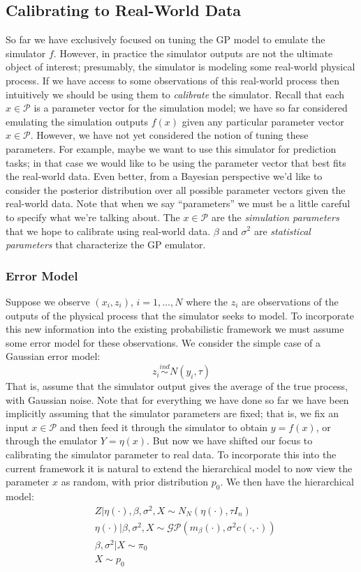 \documentclass[12pt]{article}
\begin{document}
\subsection{Calibrating to Real-World Data}
So far we have exclusively focused on tuning the GP model to emulate the simulator $f$. However, in practice the simulator outputs are not the ultimate object of interest; presumably, 
the simulator is modeling some real-world physical process. If we have access to some observations of this real-world process then intuitively we should be using them to \textit{calibrate}
the simulator. Recall that each $x \in \mathcal{P}$ is a parameter vector for the simulation model; we have so far considered emulating the simulation outputs $f(x)$ given any particular 
parameter vector $x \in \mathcal{P}$. However, we have not yet considered the notion of tuning these parameters. For example, maybe we want to use this simulator for prediction tasks; 
in that case we would like to be using the parameter vector that best fits the real-world data. Even better, from a Bayesian perspective we'd like to consider the posterior distribution over all 
possible parameter vectors given the real-world data. Note that when we say ``parameters'' we must be a little careful to specify what we're talking about. The $x \in \mathcal{P}$ are the 
\textit{simulation parameters} that we hope to calibrate using real-world data. $\beta$ and $\sigma^2$ are \textit{statistical parameters} that characterize the GP emulator. 

\subsubsection{Error Model}
Suppose we observe $(x_i, z_i)$, $i = 1, \dots, N$ where the $z_i$ are observations of the outputs of the physical process that the simulator seeks to model. To incorporate this new information
into the existing probabilistic framework we must assume some error model for these observations. We consider the simple case of a Gaussian error model: 
\[z_i \overset{ind}{\sim} N(y_i, \tau)\]
That is, assume that the simulator output gives the average of the true process, with Gaussian noise. Note that for everything we have done so far we have been implicitly assuming that the simulator 
parameters are fixed; that is, we fix an input $x \in \mathcal{P}$ and then feed it through the simulator to obtain $y = f(x)$, or through the emulator $Y = \eta(x)$. But now we have shifted our focus to 
calibrating the simulator parameter to real data. To incorporate this into the current framework it is natural to extend the hierarchical model to now view the parameter $x$ as random, with prior distribution
$p_0$. We then have the hierarchical model: 
\begin{align*}
&Z|\eta(\cdot), \beta, \sigma^2, X \sim N_N(\eta(\cdot), \tau I_n) \\
&\eta(\cdot)|\beta, \sigma^2, X \sim \mathcal{GP}(m_\beta(\cdot), \sigma^2 c(\cdot, \cdot)) \\
&\beta, \sigma^2|X \sim \pi_0 \\
&X \sim p_0
\end{align*}
\end{document}
